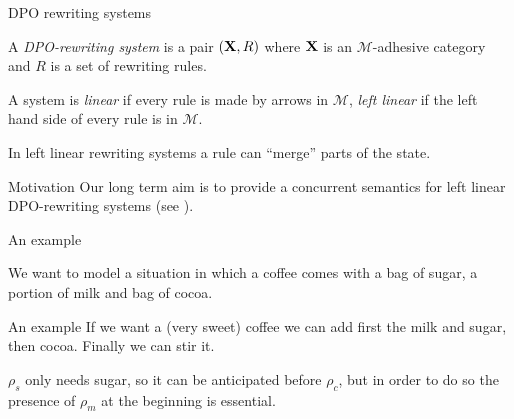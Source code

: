 \documentclass[usenames,dvipsnames]{beamer}
\def\X{\textbf {\textup{X}}}
\begin{document}
\begin{frame}{DPO rewriting systems}\justifying
		\begin{definition}
		A \emph{DPO-rewriting system} is a pair $(\X, R)$ where $\X$ is an $\mathcal{M}$-adhesive category and $R$ is a set of rewriting rules.
		\pause 
		
		A system is \emph{linear} if every rule is made by arrows in $\mathcal{M}$, \emph{left linear} if the left hand side of every rule is in $\mathcal{M}$.
	\end{definition}

\pause 

In left linear rewriting systems a rule can ``merge'' parts of the state.

\pause 
\begin{alertblock}{Motivation}
	Our long term aim is to provide a concurrent semantics for left linear DPO-rewriting systems (see \cite{baldan2017domains}). 
\end{alertblock}

\end{frame}


\begin{frame}{An example}\justifying
	
	We want to model a situation in which a coffee comes
	with a bag of sugar, a portion of milk and bag of cocoa.
	
	\pause 
\begin{figure}
	

\end{figure}
\end{frame} 

\begin{frame}{An example}
	If we want a (very sweet) coffee we can add first the milk and sugar, then cocoa. Finally we can stir it.
	\pause 
\begin{figure}
	
\end{figure}\pause 

$\rho_s$ only needs sugar, so it can be anticipated before $\rho_c$, but in order to do so the presence of $\rho_m$ at the beginning is essential.
\end{frame}
\end{document}
